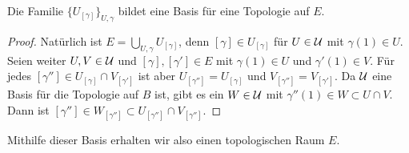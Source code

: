 \begin{theorem}
Die Familie $\{U_{[\gamma]}\}_{U, \gamma}$ bildet eine Basis für eine Topologie auf $E$.
\end{theorem}
\begin{proof}
Natürlich ist $E = \bigcup_{U, \gamma} U_{[\gamma]}$, denn $[\gamma]\in U_{[\gamma]}$ für $U\in \cal U$ mit $\gamma(1)\in U$. Seien weiter $U,V\in\cal U$ und $[\gamma],[\gamma']\in E$ mit $\gamma(1)\in U$ und $\gamma'(1)\in V$. Für jedes $[\gamma'']\in U_{[\gamma]}\cap V_{[\gamma']}$ ist aber $U_{[\gamma'']} = U_{[\gamma]}$ und $V_{[\gamma'']} = V_{[\gamma']}$. Da $\cal U$ eine Basis für die Topologie auf $B$ ist, gibt es ein $W\in\cal U$ mit $\gamma''(1)\in W\subset U\cap V$. Dann ist $[\gamma'']\in W_{[\gamma'']}\subset U_{[\gamma'']}\cap V_{[\gamma'']}$.
\end{proof}

Mithilfe dieser Basis erhalten wir also einen topologischen Raum $E$.

